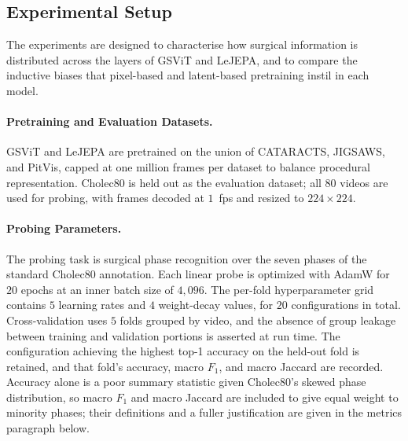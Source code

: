 \documentclass[11pt, a4paper]{article}
\begin{document}
\subsection{Experimental Setup}
The experiments are designed to characterise how surgical information is distributed across the layers of GSViT and LeJEPA, and to compare the inductive biases that pixel-based and latent-based pretraining instil in each model.

\paragraph{Pretraining and Evaluation Datasets.} GSViT and LeJEPA are pretrained on the union of CATARACTS, JIGSAWS, and PitVis, capped at one million frames per dataset to balance procedural representation. Cholec80 is held out as the evaluation dataset; all $80$ videos are used for probing, with frames decoded at $1$~fps and resized to $224 \times 224$.

\paragraph{Probing Parameters.} The probing task is surgical phase recognition over the seven phases of the standard Cholec80 annotation. Each linear probe is optimized with AdamW for $20$ epochs at an inner batch size of $4{,}096$. The per-fold hyperparameter grid contains $5$ learning rates and $4$ weight-decay values, for $20$ configurations in total. Cross-validation uses $5$ folds grouped by video, and the absence of group leakage between training and validation portions is asserted at run time. The configuration achieving the highest top-1 accuracy on the held-out  fold is retained, and that fold's accuracy, macro $F_1$, and macro 
Jaccard are recorded. Accuracy alone is a poor summary statistic given 
Cholec80's skewed phase distribution, so macro $F_1$ and macro Jaccard 
are included to give equal weight to minority phases; their definitions 
and a fuller justification are given in the metrics paragraph below.
\end{document}

